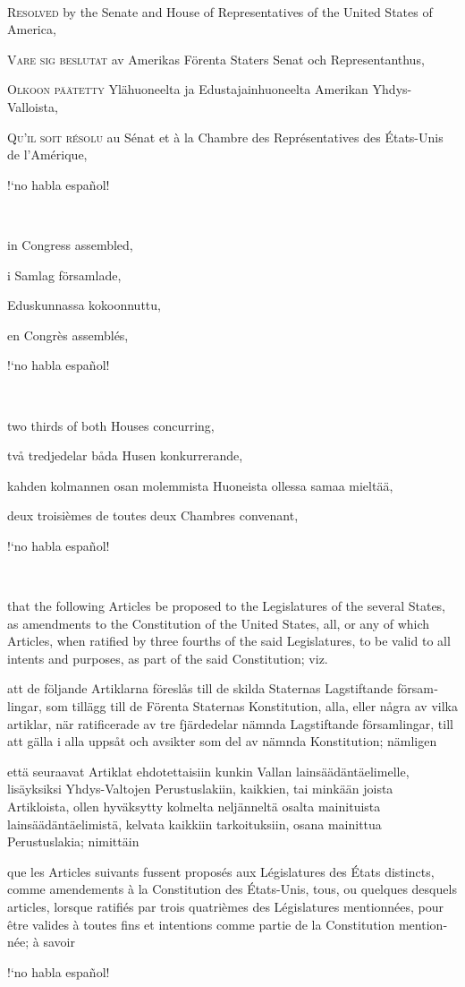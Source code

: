 \documentclass[a4paper,landscape,10pt]{article}
\newcommand{\tblock}[5]{\noindent\begin{minipage}[t]{0.18\textwidth}\foreignlanguage{english}{#1}\end{minipage}\hskip 0.025\textwidth\begin{minipage}[t]{0.18\textwidth}\foreignlanguage{swedish}{#2}\end{minipage}\hskip 0.025\textwidth\begin{minipage}[t]{0.18\textwidth}\foreignlanguage{finnish}{#3}\end{minipage}\hskip 0.025\textwidth\begin{minipage}[t]{0.18\textwidth}\foreignlanguage{french}{#4}\end{minipage}\hskip 0.025\textwidth\begin{minipage}[t]{0.18\textwidth}\foreignlanguage{spanish}{#5}\end{minipage}}
\begin{document}
~

\tblock
{\textsc{Resolved} by the Senate and House of Representatives of the United States of America,}
{\textsc{Vare sig beslutat} av Amerikas Förenta Staters Senat och Representanthus,}
{\textsc{Olkoon päätetty} Ylähuoneelta ja Edustajainhuoneelta Amerikan Yhdys-Valloista,}
{\textsc{Qu'il soit résolu} au Sénat et à la Chambre des Représentatives des États-Unis de l'Amérique,}
{!`no habla español!}

~

\tblock
{in Congress assembled,}
{i Samlag församlade,}
{Eduskunnassa kokoonnuttu,}
{en Congrès assemblés,}
{!`no habla español!}

~

\tblock
{two thirds of both Houses concurring,}
{två tredjedelar båda Husen konkurrerande,}
{kahden kolmannen osan molemmista Huoneista ollessa samaa mieltää,}
{deux troisièmes de toutes deux Chambres convenant,}
{!`no habla español!}

~

\tblock
{that the following Articles be proposed to the Legislatures of the several States, as amendments to the Constitution of the United States, all, or any of which Articles, when ratified by three fourths of the said Legislatures, to be valid to all intents and purposes, as part of the said Constitution; viz.}
{att de följande Artiklarna föreslås till de skilda Staternas Lagstiftande församlingar, som tillägg till de Förenta Staternas Konstitution, alla, eller några av vilka artiklar, när ratificerade av tre fjärdedelar nämnda Lagstiftande församlingar, till att gälla i alla uppsåt och avsikter som del av nämnda Konstitution; nämligen}
{että seuraavat Artiklat ehdotettaisiin kunkin Vallan lainsäädäntäelimelle, lisäyksiksi Yhdys-Valtojen Perustuslakiin, kaikkien, tai minkään joista Artikloista, ollen hyväksytty kolmelta neljänneltä osalta mainituista lainsäädäntäelimistä, kelvata kaikkiin tarkoituksiin, osana mainittua Perustuslakia; nimittäin}
{que les Articles suivants fussent proposés aux Législatures des États distincts, comme amendements à la Constitution des États-Unis, tous, ou quelques desquels articles, lorsque ratifiés par trois quatrièmes des Législatures mentionnées, pour être valides à toutes fins et intentions comme partie de la Constitution mentionnée; à savoir}
{!`no habla español!}

~
\end{document}
